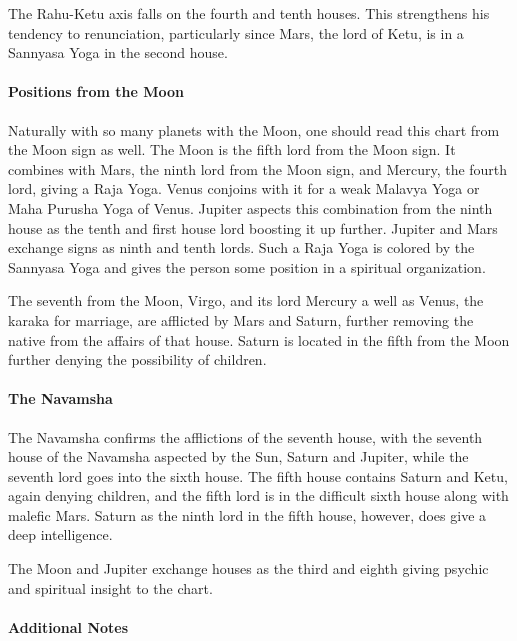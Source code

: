  

The Rahu-Ketu axis falls on the fourth and tenth houses. This strengthens his tendency to renunciation, particularly since Mars, the lord of Ketu, is in a Sannyasa Yoga in the second house.

 

\paragraph{Positions from the Moon}

 

Naturally with so many planets with the Moon, one should read this chart from the Moon sign as well. The Moon is the fifth lord from the Moon sign. It combines with Mars, the ninth lord from the Moon sign, and Mercury, the fourth lord, giving a Raja Yoga. Venus conjoins with it for a weak Malavya Yoga or Maha Purusha Yoga of Venus. Jupiter aspects this combination from the ninth house as the tenth and first house lord boosting it up further. Jupiter and Mars exchange signs as ninth and tenth lords. Such a Raja Yoga is colored by the Sannyasa Yoga and gives the person some position in a spiritual organization.

 

The seventh from the Moon, Virgo, and its lord Mercury a well as Venus, the karaka for marriage, are afflicted by Mars and Saturn, further removing the native from the affairs of that house. Saturn is located in the fifth from the Moon further denying the possibility of children.

 

\paragraph{The Navamsha}

 

The Navamsha confirms the afflictions of the seventh house, with the seventh house of the Navamsha aspected by the Sun, Saturn and Jupiter, while the seventh lord goes into the sixth house. The fifth house contains Saturn and Ketu, again denying children, and the fifth lord is in the difficult sixth house along with malefic Mars. Saturn as the ninth lord in the fifth house, however, does give a deep intelligence.

The Moon and Jupiter exchange houses as the third and eighth giving psychic and spiritual insight to the chart.

 

\paragraph{Additional Notes}

